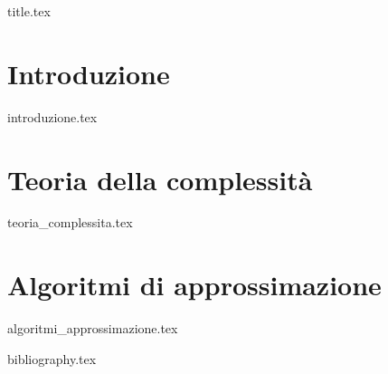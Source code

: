 \documentclass[a4paper,11pt,oneside]{book}
\begin{document}
\frontmatter

{title.tex}

\tableofcontents

\mainmatter


\chapter{Introduzione}
{introduzione.tex}


\chapter{Teoria della complessità}
{teoria_complessita.tex}

\chapter{Algoritmi di approssimazione}
{algoritmi_approssimazione.tex}

\cleardoublepage

{bibliography.tex}
\end{document}
